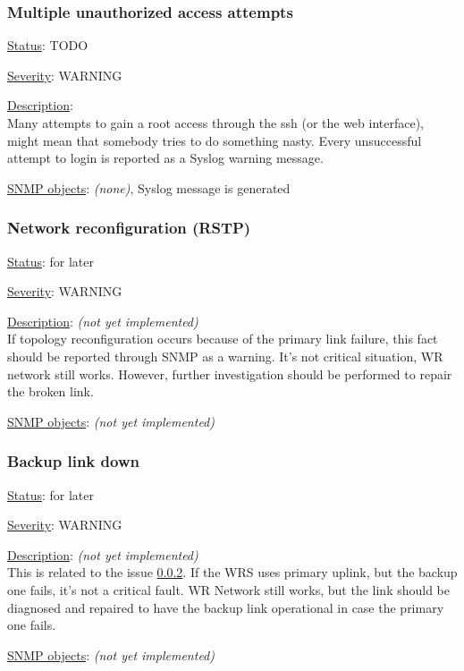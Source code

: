 \subsubsection{\bf Multiple unauthorized access attempts}
		\begin{pck_descr}
			\item [] \underline{Status}: TODO
			\item [] \underline{Severity}: WARNING
			\item [] \underline{Description}:\\
				Many attempts to gain a root access through the ssh (or the web
				interface), might mean that somebody tries to do something nasty. Every
				unsuccessful attempt to login is reported as a Syslog warning message.
			\item [] \underline{SNMP objects}: \emph{(none)}, Syslog message is
				generated
		\end{pck_descr}

\subsubsection{\bf Network reconfiguration (RSTP)}
		\label{fail:other:rstp}
		\begin{pck_descr}
			\item [] \underline{Status}: for later
			\item [] \underline{Severity}: WARNING
			\item [] \underline{Description}: \emph{(not yet implemented)}\\
				If topology reconfiguration occurs because of the primary link failure,
				this fact should be reported through SNMP as a warning. It's not
				critical situation, WR network still works. However, further
				investigation should be performed to repair the broken link.
			\item [] \underline{SNMP objects}: \emph{(not yet implemented)}
		\end{pck_descr}

\subsubsection{\bf Backup link down}
		\begin{pck_descr}
			\item [] \underline{Status}: for later
			\item [] \underline{Severity}: WARNING
			\item [] \underline{Description}: \emph{(not yet implemented)}\\
				This is related to the issue \ref{fail:other:rstp}. If the WRS uses
				primary uplink, but the backup one fails, it's not a critical fault. WR
				Network still works, but the link should be diagnosed and repaired to
				have the backup link operational in case the primary one fails.
			\item [] \underline{SNMP objects}: \emph{(not yet implemented)}
		\end{pck_descr}

